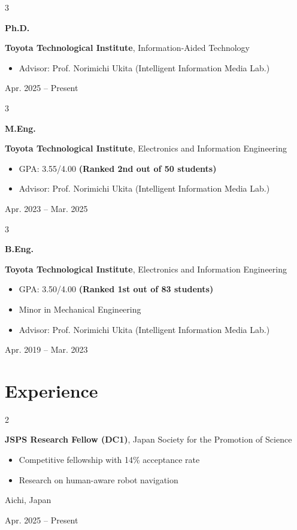 \documentclass[10pt, letterpaper]{article}
\newenvironment{highlights}{
    \begin{itemize}[
        topsep=0.10 cm,
        parsep=0.10 cm,
        partopsep=0pt,
        itemsep=0pt,
        leftmargin=0.4 cm + 10pt
    ]
}{
    \end{itemize}
} %
\newenvironment{twocolentry}[2][]{
    \onecolentry
    \def\secondColumn{#2}
    \setcolumnwidth{\fill, 4.5 cm}
    \begin{paracol}{2}
}{
    \switchcolumn \raggedleft \secondColumn
    \end{paracol}
    \endonecolentry
} %
\newenvironment{threecolentry}[3][]{
    \onecolentry
    \def\thirdColumn{#3}
    \setcolumnwidth{1 cm, \fill, 4.5 cm}
    \begin{paracol}{3}
    {\raggedright #2} \switchcolumn
}{
    \switchcolumn \raggedleft \thirdColumn
    \end{paracol}
    \endonecolentry
} %
\begin{document}
        \begin{threecolentry}{\textbf{Ph.D.}}{
            Apr. 2025 -- Present
        }
            \textbf{Toyota Technological Institute}, Information-Aided Technology
            \begin{highlights}
                \item Advisor: Prof. Norimichi Ukita (Intelligent Information Media Lab.)
            \end{highlights}
        \end{threecolentry}

        \vspace{0.2 cm}

        \begin{threecolentry}{\textbf{M.Eng.}}{
            Apr. 2023 -- Mar. 2025
        }
            \textbf{Toyota Technological Institute}, Electronics and Information Engineering
            \begin{highlights}
                \item GPA: 3.55/4.00 \textbf{(Ranked 2nd out of 50 students)}
                \item Advisor: Prof. Norimichi Ukita (Intelligent Information Media Lab.)
            \end{highlights}
        \end{threecolentry}
        
        \vspace{0.2 cm}

        \begin{threecolentry}{\textbf{B.Eng.}}{
            Apr. 2019 -- Mar. 2023
        }
            \textbf{Toyota Technological Institute}, Electronics and Information Engineering
            \begin{highlights}
                \item GPA: 3.50/4.00 \textbf{(Ranked 1st out of 83 students)}
                \item Minor in Mechanical Engineering
                \item Advisor: Prof. Norimichi Ukita (Intelligent Information Media Lab.)
            \end{highlights}
        \end{threecolentry}

    \section{Experience}

        \begin{twocolentry}{
            Aichi, Japan

        Apr. 2025 -- Present
        }
            \textbf{JSPS Research Fellow (DC1)}, Japan Society for the Promotion of Science
            \begin{highlights}
                \item Competitive fellowship with 14\% acceptance rate
                \item Research on human-aware robot navigation
            \end{highlights}
        \end{twocolentry}
        
\end{document}

